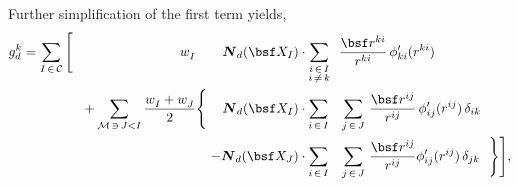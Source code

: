 \documentclass[a4paper,10pt]{article}
\def\gz  #1{           \mbox{\boldmath $\mit #1$}}
\def\mcl  #1{               {\cal #1}}
\begin{document}
Further simplification of the first term yields,
\begin{align}
 g^k_d = \sum_{I \, \in \, \mcl C}
    \Bigg[
    \,\,\,\,\,\,\,\,\,\,\,\,
    \,\,\,\,\,\,\,\,\,\,\,\,
    \,\,\,\,\,\,\,\,\,\,\,\,
    \,\,\,\,\,\,\,\,\,\,\,\,
    w^{}_I
    \,\,\,\,\,\,\,\,\,\,\,\,
    \gz N_d( \bsf X_{I})
    &\cdot
      \sum_{\substack{i \, \in \, I \\ i \, \neq \, k}}            \,\,\,
      \frac {\bsf r^{ki}}{r^{ki}}               \,
        {\phi}^\prime_{ki} (r^{ki})        \,
    \\
        + 
    \sum_{\mcl M \, \ni \, J < I}
    \frac{w^{}_I + w^{}_J}{2}
    \Bigg\{
      \,\,\,\,\,\,\,
      \gz N_d( \bsf X_{I})
      &\cdot
        \sum_{i \, \in \, I}    \,\,\,\,\,
        \sum_{j \, \in \, J}   \,
        \frac {\bsf r^{ij}}{r^{ij}}       \,
          {\phi}^\prime_{ij}(r^{ij}) \,
          \delta_{ik}           \,
        \\
      -
      \gz N_d( \bsf X_{J})
      &\cdot
        \sum_{i \, \in \, I}    \,\,\,\,\,
        \sum_{j \, \in \, J}   \,
        \frac{\bsf r^{ij}}{r^{ij}}
          {\phi}^\prime_{ij}(r^{ij}) \,
          \delta_{jk}           \,
    \,\,\,
    \Bigg\}
   \Bigg],
\end{align}
\end{document}
